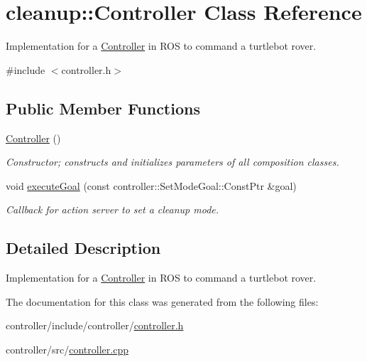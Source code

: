 \hypertarget{classcleanup_1_1_controller}{}\section{cleanup\+:\+:Controller Class Reference}
\label{classcleanup_1_1_controller}


Implementation for a \hyperlink{classcleanup_1_1_controller}{Controller} in R\+OS to command a turtlebot rover.  




{\ttfamily \#include $<$controller.\+h$>$}

\subsection*{Public Member Functions}
\begin{DoxyCompactItemize}
\item 
\mbox{\label{classcleanup_1_1_controller_a671dbda5561aac6055940113feb1726b}} 
\hyperlink{classcleanup_1_1_controller_a671dbda5561aac6055940113feb1726b}{Controller} ()
\begin{DoxyCompactList}\small\item\em Constructor; constructs and initializes parameters of all composition classes. \end{DoxyCompactList}\item 
\mbox{\label{classcleanup_1_1_controller_a8a256af786aae674272ce4837951665f}} 
void \hyperlink{classcleanup_1_1_controller_a8a256af786aae674272ce4837951665f}{execute\+Goal} (const controller\+::\+Set\+Mode\+Goal\+::\+Const\+Ptr \&goal)
\begin{DoxyCompactList}\small\item\em Callback for action server to set a cleanup mode. \end{DoxyCompactList}\end{DoxyCompactItemize}


\subsection{Detailed Description}
Implementation for a \hyperlink{classcleanup_1_1_controller}{Controller} in R\+OS to command a turtlebot rover. 

The documentation for this class was generated from the following files\+:\begin{DoxyCompactItemize}
\item 
controller/include/controller/\hyperlink{controller_8h}{controller.\+h}\item 
controller/src/\hyperlink{controller_8cpp}{controller.\+cpp}\end{DoxyCompactItemize}
